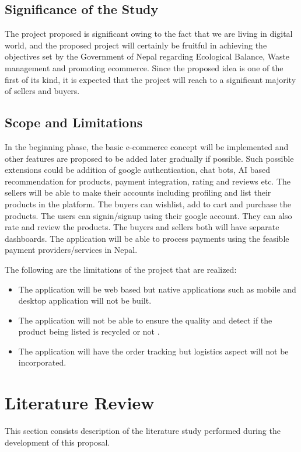 \documentclass[12pt, a4paper, oneside]{article}
\begin{document}
\subsection{Significance of the Study}
The project proposed is significant owing to the fact that we are living in digital world, and the proposed project will certainly be fruitful in achieving the objectives set by the Government of Nepal regarding Ecological Balance, Waste management and promoting ecommerce. Since the proposed idea is one of the first of its kind, it is expected that the project will reach to a significant majority of sellers and buyers.

\subsection{Scope and Limitations}
In the beginning phase, the basic e-commerce concept will be implemented and other features are proposed to be added later gradually if possible. Such possible extensions could be addition of google authentication, chat bots, AI based recommendation for products, payment integration, rating and reviews etc. The sellers will be able to make their accounts including profiling and list their products in the platform. The buyers can wishlist, add to cart and purchase the products. The users can signin/signup using their google account. They can also rate and review the products. The buyers and sellers both will have separate dashboards. The application will be able to process payments using the feasible payment providers/services in Nepal. 

The following are the limitations of the project that are realized:
\begin{itemize}
 	\item The application will be web based but native applications such as mobile and desktop application will not be built.
	\item The application will not be able to ensure the quality and detect if the product being listed is recycled or not .
	\item The application will have the order tracking but logistics aspect will not 
be incorporated.	
 \end{itemize}

\break
\section{Literature Review}
This section consists description of the literature study performed during the development of this proposal.
\end{document}
